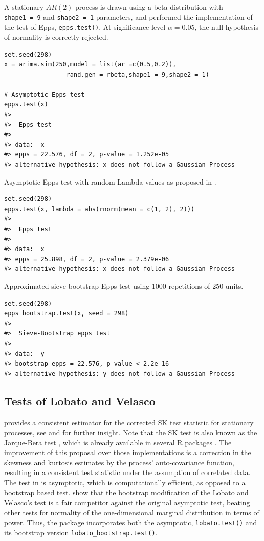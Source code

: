 A stationary \(AR(2)\) process is drawn using a beta distribution with \texttt{shape1\ =\ 9} and \texttt{shape2\ =\ 1} parameters, and performed the implementation of the test of Epps, \texttt{epps.test()}. At significance level \(\alpha = 0.05\), the null hypothesis of normality is correctly rejected.

\begin{verbatim}
set.seed(298)
x = arima.sim(250,model = list(ar =c(0.5,0.2)),
                 rand.gen = rbeta,shape1 = 9,shape2 = 1)

# Asymptotic Epps test
epps.test(x)
#> 
#>  Epps test
#> 
#> data:  x
#> epps = 22.576, df = 2, p-value = 1.252e-05
#> alternative hypothesis: x does not follow a Gaussian Process
\end{verbatim}

Asymptotic Epps test with random Lambda values as proposed in \citet{nietoreyes2014}.

\begin{verbatim}
set.seed(298)
epps.test(x, lambda = abs(rnorm(mean = c(1, 2), 2)))
#> 
#>  Epps test
#> 
#> data:  x
#> epps = 25.898, df = 2, p-value = 2.379e-06
#> alternative hypothesis: x does not follow a Gaussian Process
\end{verbatim}

Approximated sieve bootstrap Epps test using 1000 repetitions of 250 units.

\begin{verbatim}
set.seed(298)
epps_bootstrap.test(x, seed = 298)
#> 
#>  Sieve-Bootstrap epps test
#> 
#> data:  y
#> bootstrap-epps = 22.576, p-value < 2.2e-16
#> alternative hypothesis: y does not follow a Gaussian Process
\end{verbatim}

\subsection{Tests of Lobato and Velasco}\label{tests-of-lobato-and-velasco}

\citet{Lobato2004} provides a consistent estimator for the corrected SK test statistic for stationary processes, see \citet{Lomincki1961} and \citet{Gasser1975} for further insight. Note that the SK test is also known as the Jarque-Bera test \citep{jarque1980}, which is already available in several R packages \citep[for instance]{tseries}. The improvement of this proposal over those implementations is a correction in the skewness and kurtosis estimates by the process' auto-covariance function, resulting in a consistent test statistic under the assumption of correlated data. The test in \citet{Lobato2004} is asymptotic, which is computationally efficient, as opposed to a bootstrap based test. \citet{psaradakis2020normality} show that the bootstrap modification of the Lobato and Velasco's test is a fair competitor against the original asymptotic test, beating other tests for normality of the one-dimensional marginal distribution in terms of power. Thus, the package incorporates both the asymptotic, \texttt{lobato.test()} and its bootstrap version \texttt{lobato\_bootstrap.test()}.

